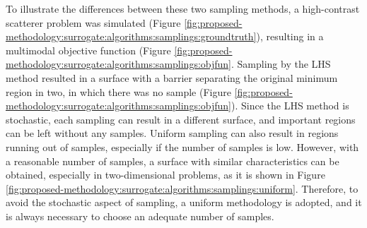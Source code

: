 			
			To illustrate the differences between these two sampling methods, a high-contrast scatterer problem was simulated (Figure \ref{fig:proposed-methodology:surrogate:algorithms:samplings:groundtruth}), resulting in a multimodal objective function (Figure \ref{fig:proposed-methodology:surrogate:algorithms:samplings:objfun}. Sampling by the LHS method resulted in a surface with a barrier separating the original minimum region in two, in which there was no sample (Figure \ref{fig:proposed-methodology:surrogate:algorithms:samplings:objfun}). Since the LHS method is stochastic, each sampling can result in a different surface, and important regions can be left without any samples. Uniform sampling can also result in regions running out of samples, especially if the number of samples is low. However, with a reasonable number of samples, a surface with similar characteristics can be obtained, especially in two-dimensional problems, as it is shown in Figure \ref{fig:proposed-methodology:surrogate:algorithms:samplings:uniform}. Therefore, to avoid the stochastic aspect of sampling, a uniform methodology is adopted, and it is always necessary to choose an adequate number of samples.

